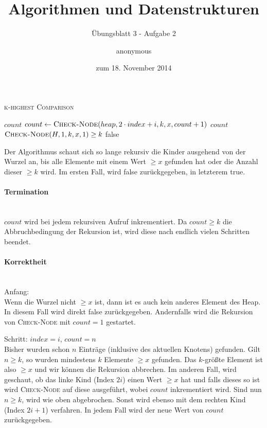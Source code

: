 \documentclass[a4paper]{scrartcl}
\title{Algorithmen und Datenstrukturen}
\subtitle{Übungsblatt 3 - Aufgabe 2}
\author{
    anonymous
}
\date{zum 18. November 2014}
\begin{document}
\maketitle


\begin{algorithm}
    \caption{\textsc{k-highest Comparison}}
    \begin{algorithmic}[1]
                    \State \Return $count$
                \EndIf
                    \State $count \gets \Call{Check-Node}{heap, 2 \cdot index + i, k, x, count + 1}$
                \EndIf
            \EndFor
            \State \Return $count$
        \EndProcedure
        \Statex
                \State \Return $\Call{Check-Node}{H, 1, k, x, 1} \geq k$
            \EndIf
            \State \Return false
        \EndProcedure
    \end{algorithmic}
\end{algorithm}

Der Algorithmus schaut sich so lange rekursiv die Kinder ausgehend von der
Wurzel an, bis alle Elemente mit einem Wert $\geq x$ gefunden hat oder die
Anzahl dieser $\geq k$ wird.
Im ersten Fall, wird false zurückgegeben, in letzterem true.

\paragraph{Termination} \hfill \\
$count$ wird bei jedem rekursiven Aufruf inkrementiert.
Da $count \geq k$ die Abbruchbedingung der Rekursion ist, wird diese nach
endlich vielen Schritten beendet.

\paragraph{Korrektheit} \hfill \\
Anfang: \\
Wenn die Wurzel nicht $\geq x$ ist, dann ist es auch kein anderes Element des
Heap.
In diesem Fall wird direkt false zurückgegeben.
Andernfalls wird die Rekursion von \textsc{Check-Node} mit $count = 1$
gestartet.

Schritt: $index = i$, $count = n$ \\
Bisher wurden schon $n$ Einträge (inklusive des aktuellen Knotens) gefunden.
Gilt $n \geq k$, so wurden mindestens $k$ Elemente $\geq x$ gefunden.
Das $k$-größte Element ist also $\geq x$ und wir können die Rekursion abbrechen.
Im anderen Fall, wird geschaut, ob das linke Kind (Index $2i$) einen Wert
$\geq x$ hat und falls dieses so ist wird \textsc{Check-Node} auf diese
ausgeführt, wobei $count$ inkrementiert wird.
Sind nun $n \geq k$, wird wie oben abgebrochen.
Sonst wird ebenso mit dem rechten Kind (Index $2i+1$) verfahren.
In jedem Fall wird der neue Wert von $count$ zurückgegeben.
\end{document}
